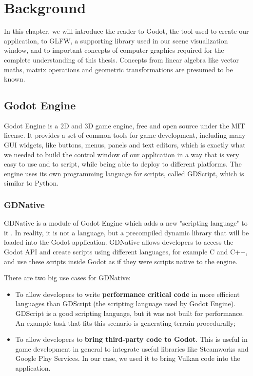 \chapter{Background}


In this chapter, we will introduce the reader to Godot, the tool used to create our application, to GLFW, a supporting library used in our scene visualization window, and to important concepts of computer graphics required for the complete understanding of this thesis. Concepts from linear algebra like vector maths, matrix operations and geometric transformations are presumed to be known.

\section{Godot Engine}
Godot Engine is a 2D and 3D game engine, free and open source under the MIT license. It provides a set of common tools for game development, including many GUI widgets, like buttons, menus, panels and text editors, which is exactly what we needed to build the control window of our application in a way that is very easy to use and to script, while being able to deploy to different platforms. The engine uses its own programming language for scripts, called GDScript, which is similar to Python.

\subsection{GDNative}
GDNative is a module of Godot Engine which adds a new "scripting language" to it \cite{gdnative_post}. In reality, it is not a language, but a precompiled dynamic library that will be loaded into the Godot application. GDNative allows developers to access the Godot API and create scripts using different languages, for example C and C++,  and use these scripts inside Godot as if they were scripts native to the engine.

There are two big use cases for GDNative:

\begin{itemize}
    \item To allow developers to write \textbf{performance critical code} in more efficient languages than GDScript (the scripting language used by Godot Engine). GDScript is a good scripting language, but it was not built for performance. An example task that fits this scenario is generating terrain procedurally;
    \item To allow developers to \textbf{bring third-party code to Godot}. This is useful in game development in general to integrate useful libraries like Steamworks and Google Play Services. In our case, we used it to bring Vulkan code into the application.
\end{itemize}


